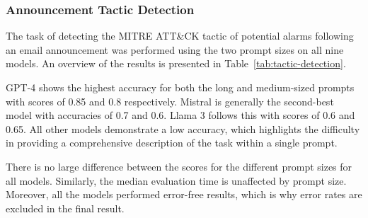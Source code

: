 \subsubsection{Announcement Tactic Detection}

The task of detecting the MITRE ATT\&CK tactic of potential alarms following an email announcement was performed using
the two prompt sizes on all nine models.
An overview of the results is presented in Table\ \ref{tab:tactic-detection}.



GPT-4 shows the highest accuracy for both the long and medium-sized prompts with scores of 0.85 and 0.8 respectively.
Mistral is generally the second-best model with accuracies of 0.7 and 0.6.
Llama 3 follows this with scores of 0.6 and 0.65.
All other models demonstrate a low accuracy, which highlights the difficulty in providing a comprehensive description
of the task within a single prompt.

There is no large difference between the scores for the different prompt sizes for all models.
Similarly, the median evaluation time is unaffected by prompt size.
Moreover, all the models performed error-free results, which is why error rates are excluded in the final result.